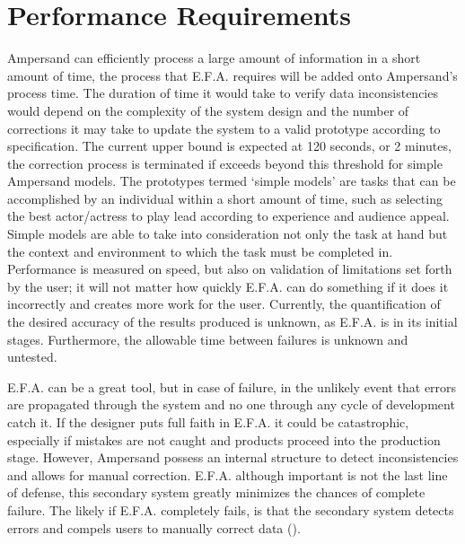 \documentclass[12pt]{report}
\begin{document}
\section{Performance Requirements}\label{sec:Performance}
Ampersand can efficiently process a large amount of information in a short amount of time, the 
process that E.F.A. requires will be added onto Ampersand’s process time. The duration of time it 
would take to verify data inconsistencies would depend on the complexity of the system design and 
the number of corrections it may take to update the system to a valid prototype according to 
specification. The current upper bound is expected at 120 seconds, or 2 minutes, the correction 
process is terminated if exceeds beyond this threshold for simple Ampersand models. The prototypes 
termed ‘simple models’ are tasks that can be accomplished by an individual within a short amount of 
time, such as selecting the best actor/actress to play lead according to experience and audience 
appeal. Simple models are able to take into consideration not only the task at hand but the context 
and environment to which the task must be completed in. Performance is measured on speed, but also 
on validation of limitations set forth by the user; it will not matter how quickly E.F.A. can do 
something if it does it incorrectly and creates more work for the user. Currently, the 
quantification of the desired accuracy of the results produced is unknown, as E.F.A. is in its 
initial stages. Furthermore, the allowable time between failures is unknown and untested.

E.F.A. can be a great tool, but in case of failure, in the unlikely event that errors are 
propagated through the system and no one through any cycle of development catch it. If the designer 
puts full faith in E.F.A. it could be catastrophic, especially if mistakes are not caught and 
products proceed into the production stage. However, Ampersand possess an internal structure to 
detect inconsistencies and allows for manual correction. E.F.A. although important is not the last 
line of defense, this secondary system greatly minimizes the chances of complete failure. The 
likely if E.F.A. completely fails, is that the secondary system detects errors and compels users to 
manually correct data (\cite[153]{RBD}). 
\end{document}
